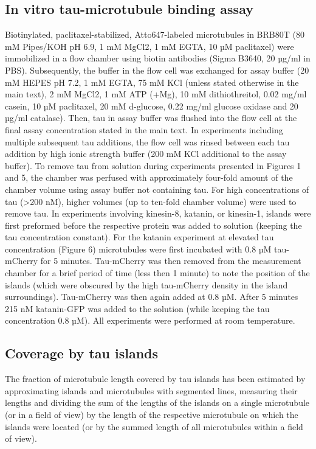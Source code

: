\subsection{In vitro tau-microtubule binding assay}
Biotinylated, paclitaxel-stabilized, Atto647-labeled microtubules in BRB80T (80 mM Pipes/KOH pH 6.9, 1 mM MgCl2, 1 mM EGTA, 10 µM paclitaxel) were immobilized in a flow chamber using biotin antibodies (Sigma B3640, 20 µg/ml in PBS). Subsequently, the buffer in the flow cell was exchanged for assay buffer (20 mM HEPES pH 7.2, 1 mM EGTA, 75 mM KCl (unless stated otherwise in the main text), 2 mM MgCl2, 1 mM ATP (+Mg), 10 mM dithiothreitol, 0.02 mg/ml casein, 10 µM paclitaxel, 20 mM d-glucose, 0.22 mg/ml glucose oxidase and 20 µg/ml catalase). Then, tau in assay buffer was flushed into the flow cell at the final assay concentration stated in the main text. In experiments including multiple subsequent tau additions, the flow cell was rinsed between each tau addition by high ionic strength buffer (200 mM KCl additional to the assay buffer). To remove tau from solution during experiments presented in Figures 1 and 5, the chamber was perfused with approximately four-fold amount of the chamber volume using assay buffer not containing tau. For high concentrations of tau (>200 nM), higher volumes (up to ten-fold chamber volume) were used to remove tau. In experiments involving kinesin-8, katanin, or kinesin-1, islands were first preformed before the respective protein was added to solution (keeping the tau concentration constant). For the katanin experiment at elevated tau concentration (Figure 6) microtubules were first incubated with 0.8 µM tau-mCherry for 5 minutes. Tau-mCherry was then removed from the measurement chamber for a brief period of time (less then 1 minute) to note the position of the islands (which were obscured by the high tau-mCherry density in the island surroundings). Tau-mCherry was then again added at 0.8 µM. After 5 minutes 215 nM katanin-GFP was added to the solution (while keeping the tau concentration 0.8 µM). All experiments were performed at room temperature. 


\subsection{Coverage by tau islands}
The fraction of microtubule length covered by tau islands has been estimated by approximating islands and microtubules with segmented lines, measuring their lengths and dividing the sum of the lengths of the islands on a single microtubule (or in a field of view) by the length of the respective microtubule on which the islands were located (or by the summed length of all microtubules within a field of view).

